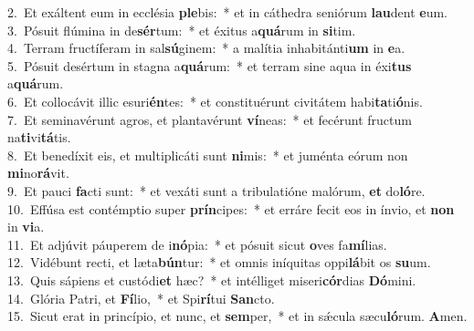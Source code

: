 {2.~}Et exáltent eum in ecclésia \textbf{ple}bis:~* et in cáthedra seniórum \textbf{lau}dent \textbf{e}um.\\
{3.~}Pósuit flúmina in de\textbf{sér}tum:~* et éxitus a\textbf{quá}rum in \textbf{si}tim.\\
{4.~}Terram fructíferam in sal\textbf{sú}ginem:~* a malítia inhabitánti\textbf{um} in \textbf{e}a.\\
{5.~}Pósuit desértum in stagna a\textbf{quá}rum:~* et terram sine aqua in éxi\textbf{tus} a\textbf{quá}rum.\\
{6.~}Et collocávit illic esuri\textbf{én}tes:~* et constituérunt civitátem habi\textbf{ta}ti\textbf{ó}nis.\\
{7.~}Et seminavérunt agros, et plantavérunt \textbf{ví}neas:~* et fecérunt fructum na\textbf{ti}vi\textbf{tá}tis.\\
{8.~}Et benedíxit eis, et multiplicáti sunt \textbf{ni}mis:~* et juménta eórum non \textbf{mi}no\textbf{rá}vit.\\
{9.~}Et pauci \textbf{fa}cti sunt:~* et vexáti sunt a tribulatióne malórum, \textbf{et} do\textbf{ló}re.\\
{10.~}Effúsa est contémptio super \textbf{prín}cipes:~* et erráre fecit eos in ínvio, et \textbf{non} in \textbf{vi}a.\\
{11.~}Et adjúvit páuperem de i\textbf{nó}pia:~* et pósuit sicut \textbf{o}ves fa\textbf{mí}lias.\\
{12.~}Vidébunt recti, et læta\textbf{bún}tur:~* et omnis iníquitas oppi\textbf{lá}bit os \textbf{su}um.\\
{13.~}Quis sápiens et custódi\textbf{et} hæc?~* et intélliget miseri\textbf{cór}dias \textbf{Dó}mini.\\
{14.~}Glória Patri, et \textbf{Fí}lio,~* et Spi\textbf{rí}tui \textbf{San}cto.\\
{15.~}Sicut erat in princípio, et nunc, et \textbf{sem}per,~* et in sǽcula sæcu\textbf{ló}rum. \textbf{A}men.\\
